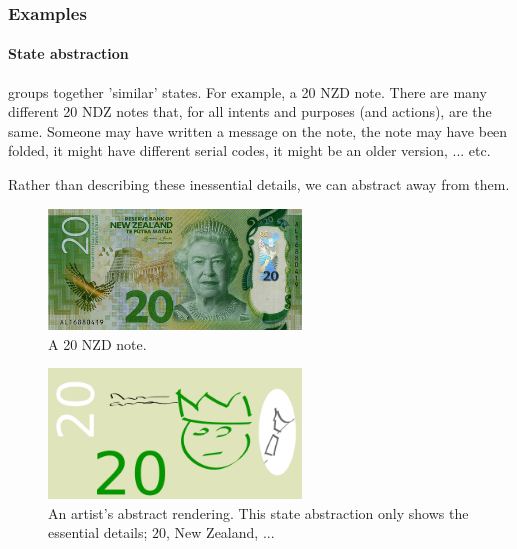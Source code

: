 


\subsubsection{Examples}

\paragraph{State abstraction} groups together 'similar' states. For example, a 20 NZD note.
There are many different 20 NDZ notes that, for all intents and purposes (and actions), are the same.
Someone may have written a message on the note, the note may have been folded,
it might have different serial codes, it might be an older version, ... etc.

Rather than describing these inessential details, we can abstract away from them.

\begin{figure}[h!]
\centering
\includegraphics[width=0.6\textwidth,height=0.15\textheight]{../../pictures/images/nz20.png}
\caption{A 20 NZD note.}
\end{figure}

\begin{figure}[h!]
\centering
\includegraphics[width=0.6\textwidth,height=0.15\textheight]{../../pictures/drawings/my-nz20.png}
\caption{An artist's abstract rendering. This state abstraction only shows the essential details; $20$, New Zealand, ...}
\end{figure}

